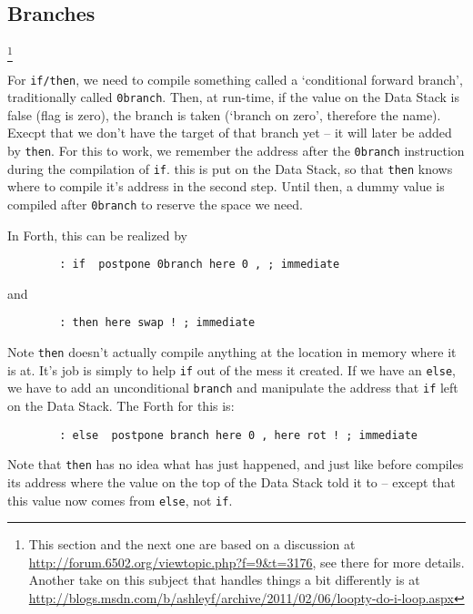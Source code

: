 \begin{enumerate}
{{%
\section{Branches} 
\footnote{This section and the next one are based on a discussion at
\href{http://forum.6502.org/viewtopic.php?f=9&t=3176}
{http://forum.6502.org/viewtopic.php?f=9&t=3176}, see there for more details.
Another take on this subject that handles things a bit differently is at
\href{http://blogs.msdn.com/b/ashleyf/archive/2011/02/06/loopty-do-i-loop.aspx}{http://blogs.msdn.com/b/ashleyf/archive/2011/02/06/loopty-do-i-loop.aspx}
}

For \texttt{if/then}, we need to compile something called a `conditional forward
branch', traditionally called \texttt{0branch}. Then, at run-time, if the value
on the Data Stack is false (flag is zero), the branch is taken (`branch on
zero', therefore the name). Execpt that we don't have the target of that branch
yet -- it will later be added by \texttt{then}. For this to work, we remember
the address after the \texttt{0branch} instruction during the compilation of
\texttt{if}. this is put on the Data Stack, so that \texttt{then} knows where to
compile it's address in the second step.  Until then, a dummy value is compiled
after \texttt{0branch} to reserve the space we need. 

In Forth, this can be realized by

\begin{lstlisting}
        : if  postpone 0branch here 0 , ; immediate
\end{lstlisting}

and 

\begin{lstlisting}
        : then here swap ! ; immediate
\end{lstlisting}

Note \texttt{then} doesn't actually compile anything at the location in memory
where it is at. It's job is simply to help \texttt{if} out of the mess it
created.  If we have an \texttt{else}, we have to add an unconditional
\texttt{branch} and manipulate the address that \texttt{if} left on the Data
Stack. The Forth for this is: 

\begin{lstlisting}
        : else  postpone branch here 0 , here rot ! ; immediate
\end{lstlisting}

Note that \texttt{then} has no idea what has just happened, and just like before
compiles its address where the value on the top of the Data Stack told it to --
except that this value now comes from \texttt{else}, not \texttt{if}. 


}}
\end{enumerate}

